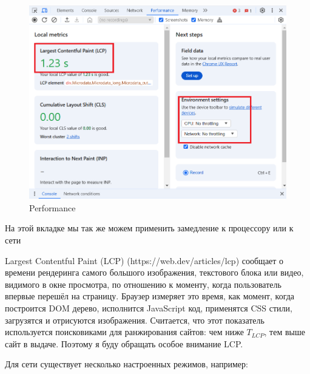 \documentclass[12pt]{article}
\begin{document}
\begin{figure}[H]
    \centering
    \includegraphics[width=1\textwidth]{../images/performance.png}
    \caption{Performance}
\end{figure}

На этой вкладке мы так же можем применить замедление к процессору или к сети

Largest Contentful Paint (LCP) (https://web.dev/articles/lcp) сообщает о времени рендеринга
самого большого изображения, текстового блока или видео,
видимого в окне просмотра, по отношению к моменту,
когда пользователь впервые перешёл на страницу.
Браузер измеряет это время, как момент, когда построится DOM дерево,
исполнится JavaScript код, применятся CSS стили, загрузятся и отрисуются изображения.
Считается, что этот показатель используется поисковиками для ранжирования сайтов: чем ниже $T_{LCP}$,
тем выше сайт в выдаче.
Поэтому я буду обращать особое внимание LCP.

Для сети существует несколько настроенных режимов, например:
\end{document}
